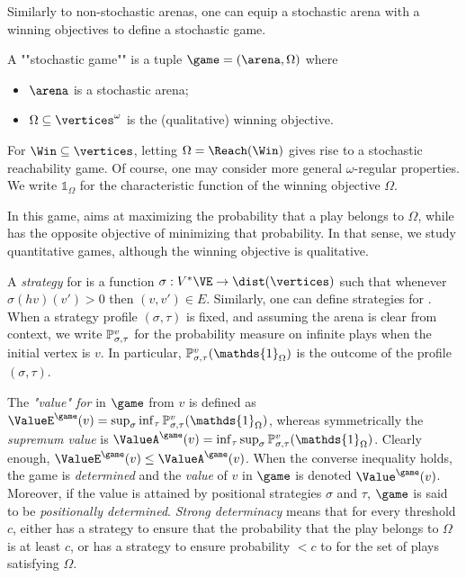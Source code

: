 Similarly to non-stochastic arenas, one can equip a stochastic arena
with a winning objectives to define a stochastic game.
\begin{definition}
  A ""stochastic game"" is a tuple $\game = (\arena,\Omega)$ where
  \begin{itemize}
  \item $\arena$ is a stochastic arena;
  \item $\Omega \subseteq \vertices^\omega$ is the (qualitative)
    winning objective.
  \end{itemize}
\end{definition}

For $\Win \subseteq \vertices$, letting $\Omega = \Reach(\Win)$ gives
rise to a stochastic reachability game.
Of course, one may consider more general $\omega$-regular
properties. We write $\mathds{1}_\Omega$ for the characteristic
function of the winning objective $\Omega$.


In this game, \Eve aims at maximizing the probability that a play
belongs to $\Omega$, while \Adam has the opposite objective of
minimizing that probability. In that sense, we study quantitative
games, although the winning objective is qualitative.

A \emph{strategy} for \Eve is a function
$\sigma: V^* \VE \to \dist(\vertices)$ such that whenever
$\sigma(h v)(v') >0$ then $(v,v') \in E$. Similarly, one can define
strategies for \Adam. When a strategy profile $(\sigma,\tau)$ is
fixed, and assuming the arena is clear from context, we write
$\mathbb{P}_{\sigma,\tau}^v$ for the probability measure on infinite plays
when the initial vertex is $v$. In particular,
$\probm_{\sigma,\tau}^v(\mathds{1}_\Omega)$ is the outcome of the profile
$(\sigma,\tau)$.





The \emph{"value" for \Eve} in $\game$ from $v$ is defined as
$\ValueE^\game(v) = \sup_{\sigma} \inf_{\tau}
\probm_{\sigma,\tau}^v(\mathds{1}_\Omega)$, whereas symmetrically the
\emph{supremum value} is
$\ValueA^\game(v) = \inf_{\tau}\sup_{\sigma}
\probm_{\sigma,\tau}^v(\mathds{1}_\Omega)$. Clearly enough,
$\ValueE^\game(v) \leq \ValueA^\game(v)$.  When the converse
inequality holds, the game is \emph{determined} and the \emph{value}
of $v$ in $\game$ is denoted $\Value^\game(v)$. Moreover, if the value
is attained by positional strategies $\sigma$ and $\tau$, $\game$ is
said to be \emph{positionally determined}. \emph{Strong determinacy}
means that for every threshold $c$, either \Eve has a strategy to
ensure that the probability that the play belongs to $\Omega$ is at
least $c$, or \Adam has a strategy to ensure probability $< c$ to for
the set of plays satisfying $\Omega$.

